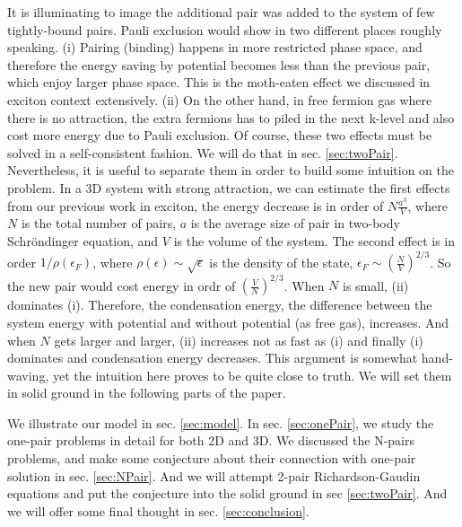 \documentclass[3p,twocolumn]{elsarticle}
\begin{document}
It is illuminating to image the additional pair was added to the system of few tightly-bound pairs.   Pauli exclusion would show in two different places roughly speaking.  (i) Pairing (binding) happens in more restricted phase space, and therefore the energy saving by potential becomes less than the previous pair, which enjoy larger phase space.  This is the moth-eaten effect we discussed in exciton context extensively\cite{CobosonPhysicsReports}.  (ii) On the other hand, in free fermion gas where there is no attraction, the extra fermions has to piled in the next k-level and also cost more energy due to Pauli exclusion.  Of course, these two effects must be solved in a self-consistent fashion.  We will do that in sec. \ref{sec:twoPair}.  Nevertheless, it is useful to separate them in order to build some intuition on the problem.  In a 3D system with strong attraction, we can estimate the first effects from our previous work in exciton, the energy decrease is in order of $N\frac{a^3}{V}$, where $N$ is the total number of pairs, $a$ is the average size of pair in two-body Schr\"{o}ndinger equation, and $V$ is the volume of the system. The second effect is in order $1/\rho(\epsilon_F)$, where $\rho(\epsilon)\sim\sqrt{\epsilon}$ is the density of the state, $\epsilon_F\sim\left(\frac{N}{V}\right)^{2/3}$. So the new pair would cost energy in ordr of $\left(\frac{V}{N}\right)^{2/3}$. When $N$ is small, (ii) dominates (i). Therefore, the condensation energy, the difference between the system energy with potential and without potential (as free gas), increases.  And when $N$ gets larger and larger, (ii) increases not as fast as (i) and finally (i) dominates and condensation energy decreases.    This argument is somewhat hand-waving, yet the intuition here proves to be quite close to truth.  We will set them in solid ground in the following parts of the paper. 

We illustrate our model in sec. \ref{sec:model}.  In sec. \ref{sec:onePair}, we study the one-pair problems in detail for both 2D and 3D.  We discussed the N-pairs problems, and make some conjecture about their connection with one-pair solution  in sec. \ref{sec:NPair}.  And we will attempt 2-pair Richardson-Gaudin equations and put the conjecture into the solid ground in sec \ref{sec:twoPair}.  And we will offer some final thought in sec. \ref{sec:conclusion}.
\end{document}
